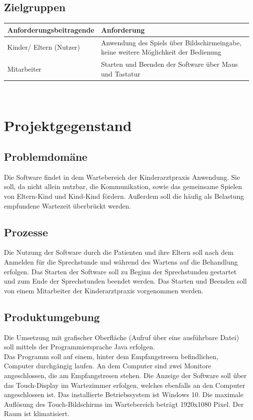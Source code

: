 \documentclass[12pt]{article}
\begin{document}
\subsection{Zielgruppen}
\begin{tabularx}{\textwidth}{|l|X|} \hline
\textbf{Anforderungsbeitragende}  & \textbf{Anforderung}\\ \hline
Kinder/ Eltern (Nutzer) & Anwendung des Spiels über Bildschirmeingabe, keine weitere Möglichkeit der Bedienung \\ \hline
Mitarbeiter & Starten und Beenden der Software über Maus und Tastatur \\ \hline
\end{tabularx}\\

\section{Projektgegenstand}
\subsection{Problemdomäne}
Die Software findet in dem Wartebereich der Kinderarztpraxis Anwendung. Sie soll, da nicht allein nutzbar, die Kommunikation, sowie das gemeinsame Spielen von Eltern-Kind und Kind-Kind fördern. Außerdem soll die häufig als Belastung empfundene Wartezeit überbrückt werden.

\subsection{Prozesse}
Die Nutzung der Software durch die Patienten und ihre Eltern soll nach dem Anmelden für die \Gls{Sprechstunde} und während des Wartens auf die Behandlung erfolgen. Das Starten der Software soll zu Beginn der Sprechstunden gestartet und zum Ende der Sprechstunden beendet werden. Das Starten und Beenden soll von einem Mitarbeiter der Kinderarztpraxis vorgenommen werden.

\subsection{Produktumgebung}
Die Umsetzung mit grafischer Oberfläche (Aufruf über eine ausführbare Datei) soll mittels der Programmiersprache Java erfolgen.\\
Das Programm soll auf einem, hinter dem \Gls{Empfangstresen} befindlichen, Computer durchgängig laufen. An dem Computer sind zwei Monitore angeschlossen, die am \Gls{Empfangstresen} stehen. Die Anzeige der Software soll über das Touch-Display im Wartezimmer erfolgen, welches ebenfalls an den Computer angeschlossen ist. Das installierte Betriebssystem ist Windows 10. Die maximale Auflösung des Touch-Bildschirms im Wartebereich beträgt 1920x1080 Pixel. Der Raum ist klimatisiert.
\end{document}

